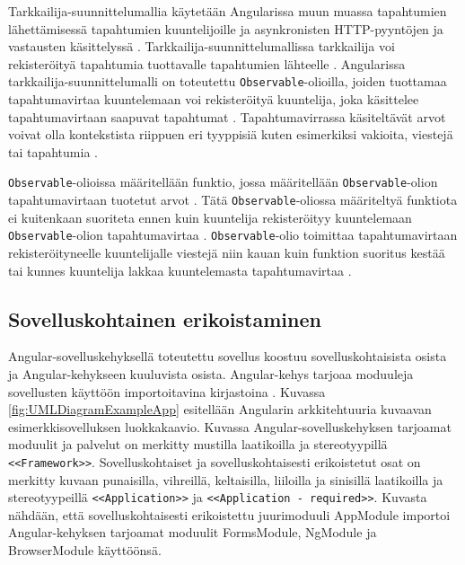 \documentclass[finnish]{tktltiki2}
\theoremstyle{definition}
\theoremstyle{remark}
\numberwithin{figure}{section}
\begin{document}
Tarkkailija-suunnittelumallia käytetään Angularissa muun muassa tapahtumien lähettämisessä tapahtumien kuuntelijoille ja asynkronisten HTTP-pyyntöjen ja vastausten käsittelyssä \cite{ObservablesInAngular}. Tarkkailija-suunnittelumallissa tarkkailija voi rekisteröityä tapahtumia tuottavalle tapahtumien lähteelle \cite{Ohjelmistoarkkitehtuurit}. Angularissa tarkkailija-suunnittelumalli on toteutettu \texttt{Observable}-olioilla, joiden tuottamaa tapahtumavirtaa kuuntelemaan voi rekisteröityä kuuntelija, joka käsittelee tapahtumavirtaan saapuvat tapahtumat \cite{Observables}. Tapahtumavirrassa käsiteltävät arvot voivat olla kontekstista riippuen eri tyyppisiä kuten esimerkiksi vakioita, viestejä tai tapahtumia \cite{Observables}.

\texttt{Observable}-olioissa määritellään funktio, jossa määritellään \texttt{Observable}-olion tapahtumavirtaan tuotetut arvot \cite{Observables}. Tätä \texttt{Observable}-oliossa määriteltyä funktiota ei kuitenkaan suoriteta ennen kuin kuuntelija rekisteröityy kuuntelemaan \texttt{Observable}-olion tapahtumavirtaa \cite{Observables}. \texttt{Observable}-olio toimittaa tapahtumavirtaan rekisteröityneelle kuuntelijalle viestejä niin kauan kuin funktion suoritus kestää tai kunnes kuuntelija lakkaa kuuntelemasta tapahtumavirtaa \cite{Observables}. 


\subsection{Sovelluskohtainen erikoistaminen}

Angular-sovelluskehyksellä toteutettu sovellus koostuu sovelluskohtaisista osista ja Angular-kehykseen kuuluvista osista. Angular-kehys tarjoaa moduuleja sovellusten käyttöön importoitavina kirjastoina \cite{NgModules}. Kuvassa \ref{fig:UMLDiagramExampleApp} esitellään Angularin arkkitehtuuria kuvaavan esimerkkisovelluksen \cite{ExampleApplication} luokkakaavio. Kuvassa Angular-sovelluskehyksen tarjoamat moduulit ja palvelut on merkitty mustilla laatikoilla ja stereotyypillä \texttt{<<Framework>>}. Sovelluskohtaiset ja sovelluskohtaisesti erikoistetut osat on merkitty kuvaan punaisilla, vihreillä, keltaisilla, liiloilla ja sinisillä laatikoilla ja stereotyypeillä \texttt{<<Application>>} ja \texttt{<<Application - required>>}. Kuvasta nähdään, että sovelluskohtaisesti erikoistettu juurimoduuli AppModule importoi Angular-kehyksen tarjoamat moduulit FormsModule, NgModule ja BrowserModule käyttöönsä.
\end{document}
